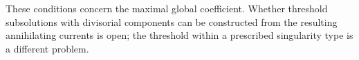 



These conditions concern the maximal global coefficient. Whether threshold subsolutions with divisorial components can be constructed from the resulting annihilating currents is open; the threshold within a prescribed singularity type is a different problem.
